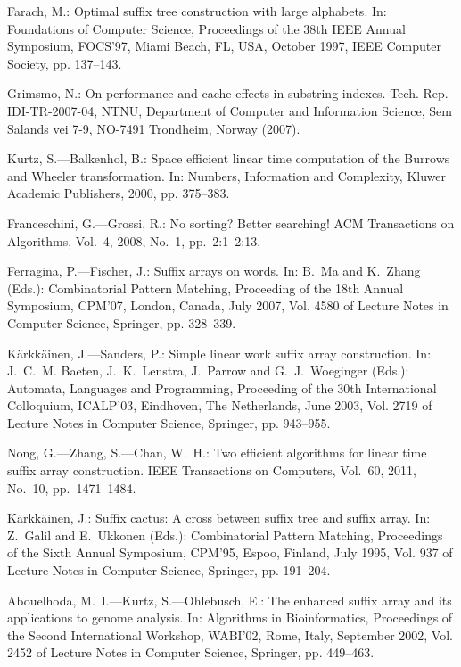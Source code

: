 \documentclass{cai}
\begin{document}
\begin{thebibliography}{99}
Farach, M.: Optimal suffix tree construction with large alphabets. 
  In: Foundations of Computer Science,
  Proceedings of the 38th IEEE Annual Symposium, FOCS'97, Miami Beach, FL, USA, October 1997,
  IEEE Computer Society, pp. 137--143.

Grimsmo, N.: On performance and cache effects in substring indexes. Tech. Rep.
  IDI-TR-2007-04, NTNU, Department of Computer and Information Science, Sem
  Salands vei 7-9, NO-7491 Trondheim, Norway (2007).

Kurtz, S.---Balkenhol, B.: Space efficient linear time computation of the
  {Burrows} and {Wheeler} transformation. In: Numbers, Information and
  Complexity, Kluwer Academic Publishers, 2000, pp. 375--383.

Franceschini, G.---Grossi, R.: No sorting? {B}etter searching! ACM Transactions
  on Algorithms, Vol.~4, 2008, No.~1, pp.~2:1--2:13.

Ferragina, P.---Fischer, J.: Suffix arrays on words. 
  In: B.~Ma and K.~Zhang (Eds.):
  Combinatorial Pattern Matching,
  Proceeding of the 18th Annual Symposium, CPM'07, London, Canada, July 2007,
  Vol. 4580 of Lecture Notes in Computer Science, Springer, pp. 328--339.

K{\"a}rkk{\"a}inen, J.---Sanders, P.: Simple linear work suffix array
  construction. 
  In: J.~C.~M. Baeten, J.~K.~Lenstra, J.~Parrow and G.~J.~Woeginger (Eds.): 
  Automata, Languages and Programming,
  Proceeding of the 30th International Colloquium, ICALP'03,
  Eindhoven, The Netherlands, June 2003,
  Vol. 2719 of Lecture Notes in Computer Science, Springer, pp. 943--955.

Nong, G.---Zhang, S.---Chan, W.~H.: Two efficient algorithms for linear time suffix
  array construction. IEEE Transactions on Computers, Vol.~60, 2011, No.~10, 
  pp.~1471--1484.

K{\"a}rkk{\"a}inen, J.: Suffix cactus: A cross between suffix tree and suffix
  array. In: Z.~Galil and E.~Ukkonen (Eds.): 
  Combinatorial Pattern Matching,
  Proceedings of the Sixth Annual Symposium, CPM'95, Espoo, Finland, July 1995,
  Vol. 937 of Lecture Notes in Computer Science, Springer, pp. 191--204.

Abouelhoda, M.~I.---Kurtz, S.---Ohlebusch, E.: The enhanced suffix array and its
  applications to genome analysis.
  In: Algorithms in Bioinformatics, 
  Proceedings of the Second International Workshop, WABI'02, Rome, Italy, September 2002,
  Vol. 2452 of Lecture Notes in Computer Science, Springer, pp. 449--463.


\end{thebibliography}
\end{document}

